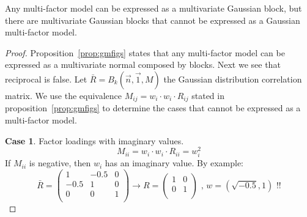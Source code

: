 \documentclass[11pt,fleqn]{book} %
\begin{document}
\begin{proposition}
	\label{prop:ibne}
	Any multi-factor model can be expressed as a multivariate Gaussian 
	block, but there are multivariate Gaussian blocks that cannot be 
	expressed as a Gaussian multi-factor model.
\end{proposition}
\begin{proof}
	Proposition~\ref{prop:gmfigs} states that any multi-factor model 
	can be expressed as a multivariate normal composed by blocks.
	Next we see that reciprocal is false. Let 
	$\bar{R} = B_k(\vec{n},\vec{1},M)$ the Gaussian distribution 
	correlation matrix. We use the equivalence 
	$M_{ij} = w_i \cdot w_i \cdot R_{ij}$ stated in 
	proposition~\ref{prop:gmfigs} to determine the cases that cannot be 
	expressed as a multi-factor model.

	\textbf{Case 1}. Factor loadings with imaginary values.
	\begin{displaymath}
		M_{ii} = w_i \cdot w_i \cdot R_{ii} = w_i^2
	\end{displaymath}
	If $M_{ii}$ is negative, then $w_i$ has an imaginary value.
	By example:
	\begin{displaymath}
		\bar{R} = \left(
		\begin{array}{cc|c}
			1    & -0.5 & 0 \\
			-0.5 & 1    & 0 \\
			\hline
			0    & 0    & 1 \\
		\end{array}
		\right) 
		\longrightarrow
		R = \left(
		\begin{array}{cc}
			1 & 0 \\
			0 & 1 \\
		\end{array}
		\right)
		\text{ , }
		w = (\sqrt{-0.5}, 1)
		\text{ !!}
	\end{displaymath}
	

\end{proof}
\end{document}
